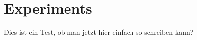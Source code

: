 
\chapter{Experiments}
\label{chapter:Experiments}
Dies ist ein Test, ob man jetzt hier einfach so schreiben kann?